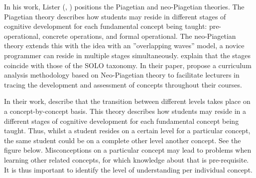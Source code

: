 In his work, Lister (\citeyear{lister2010naturally}, \citeyear{lister2016toward}) positions the Piagetian and neo-Piagetian theories. The Piagetian theory describes how students may reside in different stages of cognitive development for each fundamental concept being taught: pre-operational, concrete operations, and formal operational. The neo-Piagetian theory extends this with the idea with an ”overlapping waves” model, a novice programmer can reside in multiple stages simultaneously.  explain that the stages coincide with those of the SOLO taxonomy. In their paper,  propose a curriculum analysis methodology based on Neo-Piagetian theory to facilitate lecturers in tracing the development and assessment of concepts throughout their courses.

In their work,  describe that the transition between different levels takes place on a concept-by-concept basis. This theory describes how students may reside in a different stages of cognitive development for each fundamental concept being taught. Thus, whilst a student resides on a certain level for a particular concept, the same student could be on a complete other level another concept. See the figure below. Misconceptions on a particular concept may lead to problems when learning other related concepts, for which knowledge about that is pre-requisite. It is thus important to identify the level of understanding per individual concept.


